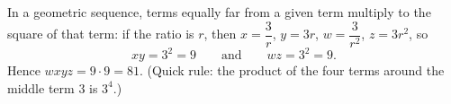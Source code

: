 In a geometric sequence, terms equally far from a given term multiply to the square of that term: if the ratio is $r$, then $x=\dfrac{3}{r}$, $y=3r$, $w=\dfrac{3}{r^2}$, $z=3r^2$, so
\[
xy=3^2=9\qquad\text{and}\qquad wz=3^2=9 .
\]
Hence $wxyz=9\cdot9=\boxed{81}$. (Quick rule: the product of the four terms around the middle term $3$ is $3^4$.)
